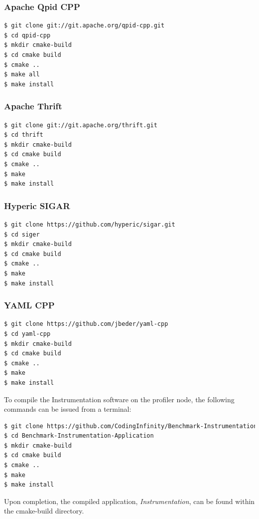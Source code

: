 \documentclass[11pt,a4paper]{article}
\begin{document}
\subsubsection{Apache Qpid CPP}
\begin{lstlisting}[language=bash]
$ git clone git://git.apache.org/qpid-cpp.git
$ cd qpid-cpp
$ mkdir cmake-build
$ cd cmake build
$ cmake ..
$ make all
$ make install
\end{lstlisting}

\subsubsection{Apache Thrift}
\begin{lstlisting}[language=bash]
$ git clone git://git.apache.org/thrift.git
$ cd thrift
$ mkdir cmake-build
$ cd cmake build
$ cmake ..
$ make
$ make install
\end{lstlisting}

\subsubsection{Hyperic SIGAR}
\begin{lstlisting}[language=bash]
$ git clone https://github.com/hyperic/sigar.git
$ cd siger
$ mkdir cmake-build
$ cd cmake build
$ cmake ..
$ make
$ make install
\end{lstlisting}

\subsubsection{YAML CPP}
\begin{lstlisting}[language=bash]
$ git clone https://github.com/jbeder/yaml-cpp
$ cd yaml-cpp
$ mkdir cmake-build
$ cd cmake build
$ cmake ..
$ make
$ make install
\end{lstlisting}

To compile the Instrumentation software on the profiler node, the following
commands can be issued from a terminal:
\begin{lstlisting}[language=bash]
$ git clone https://github.com/CodingInfinity/Benchmark-Instrumentation-Application.git
$ cd Benchmark-Instrumentation-Application
$ mkdir cmake-build
$ cd cmake build
$ cmake ..
$ make
$ make install
\end{lstlisting}

Upon completion, the compiled application, \textit{Instrumentation}, can be
found within the cmake-build directory. 
\end{document}
